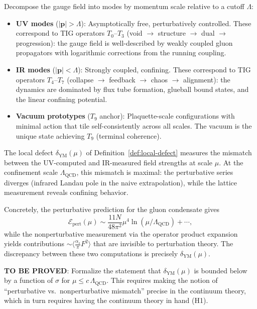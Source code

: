 \documentclass[11pt]{article}
\begin{document}
Decompose the gauge field into modes by momentum scale relative to
a cutoff $\Lambda$:
\begin{itemize}
  \item \textbf{UV modes} ($|\mathbf{p}| > \Lambda$): Asymptotically
    free, perturbatively controlled.  These correspond to TIG
    operators $T_0$--$T_3$
    (void $\to$ structure $\to$ dual $\to$ progression): the gauge
    field is well-described by weakly coupled gluon propagators with
    logarithmic corrections from the running coupling.

  \item \textbf{IR modes} ($|\mathbf{p}| < \Lambda$): Strongly coupled,
    confining.  These correspond to TIG operators $T_4$--$T_7$
    (collapse $\to$ feedback $\to$ chaos $\to$ alignment): the
    dynamics are dominated by flux tube formation, glueball bound
    states, and the linear confining potential.

  \item \textbf{Vacuum prototypes} ($T_9$ anchor): Plaquette-scale
    configurations with minimal action that tile self-consistently
    across all scales.  The vacuum is the unique state achieving
    $T_9$ (terminal coherence).
\end{itemize}

The local defect $\delta_{\mathrm{YM}}(\mu)$ of
Definition~\ref{def:local-defect} measures the mismatch between the
UV-computed and IR-measured field strengths at scale $\mu$.  At the
confinement scale $\Lambda_{\mathrm{QCD}}$, this mismatch is maximal:
the perturbative series diverges (infrared Landau pole in the naive
extrapolation), while the lattice measurement reveals confining
behavior.

Concretely, the perturbative prediction for the gluon condensate gives
\begin{equation}\label{eq:pert-condensate}
  \mathcal{E}_{\mathrm{pert}}(\mu) \sim
  \frac{11 N}{48\pi^2} \mu^4 \ln(\mu/\Lambda_{\mathrm{QCD}}) + \cdots,
\end{equation}
while the nonperturbative measurement via the operator product expansion
yields contributions $\sim \langle\frac{\alpha_s}{\pi}F^2\rangle$
that are invisible to perturbation theory.  The discrepancy between
these two computations is precisely $\delta_{\mathrm{YM}}(\mu)$.

\textbf{TO BE PROVED}: Formalize the statement that
$\delta_{\mathrm{YM}}(\mu)$ is bounded below by a function of
$\sigma$ for $\mu \leq c\,\Lambda_{\mathrm{QCD}}$.  This requires
making the notion of ``perturbative vs.\ nonperturbative mismatch''
precise in the continuum theory, which in turn requires having the
continuum theory in hand (H1).
\end{document}
